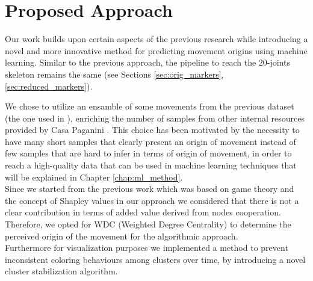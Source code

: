 \chapter{Proposed Approach}
Our work builds upon certain aspects of the previous research while introducing a novel and more innovative method for predicting movement origins using machine learning. 
Similar to the previous approach, the pipeline to reach the 20-joints skeleton remains the same (see Sections \ref{sec:orig_markers}, \ref{sec:reduced_markers}).

We chose to utilize an ensamble of some movements from the previous dataset (the one used in \cite{kolykhalova:2020}), enriching the number of samples from other internal resources provided by Casa Paganini \cite{casaPaganini}. 
This choice has been motivated by the necessity to have many short samples that clearly present an origin of movement instead of few samples that are hard to infer in terms of origin of movement, in order to 
reach a high-quality data that can be used in machine learning techniques that will be explained in Chapter \ref{chap:ml_method}.\\
Since we started from the previous work which was based on game theory and the concept of Shapley values in our approach we considered that there is not a clear contribution in terms of added value derived from nodes cooperation. 
Therefore, we opted for WDC (Weighted Degree Centrality) to determine the perceived origin of the movement for the algorithmic approach.\\
Furthermore for visualization purposes we implemented a method to prevent inconsistent coloring behaviours among clusters over time, by introducing a novel cluster stabilization algorithm. 

